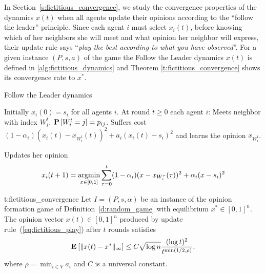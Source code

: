 In Section~\ref{s:fictitious_convergence}, we study the convergence properties
of the dynamics $x(t)$ when all agents update their opinions
according to the \enquote{follow the leader} principle.
Since each agent $i$ must select $x_i(t)$, before knowing which of her neighbors she
will meet and what opinion her neighbor will express, their update rule
says \enquote{\emph{play the best according to what you have observed}}.
For a given instance $(P,s,a)$ of the game %
the Follow the Leader dynamics $x(t)$ is defined in \ref{alg:fictitious_dynamics} and
Theorem \ref{t:fictitious_convergence} shows its convergence rate to $x^*$.
%
\begin{algorithm}
  \caption{Follow the Leader dynamics}
  \label{alg:fictitious_dynamics}
  \begin{algorithmic}[1]
    \STATE Initially $x_i(0) = s_i$ for all agents $i$.
    \STATE At round $t\geq 0$ each agent $i$:
    \bindent
    \STATE Meets neighbor with index $W_i^t$, $\bm{\mathrm{P}}\left[W_i^t=j\right]=p_{ij}$.
    \STATE Suffers cost \((1-\alpha_i) (x_i(t) - x_{W_i^t}(t))^2 + a_i (x_i(t) - s_i)^2\)
    and learns the opinion $x_{W_i^t}$.
  \item Updates her opinion
    \begin{equation}\label{eq:fictitious_play}
      x_i(t+1) =
      \operatorname*{argmin}_{x \in [0,1]}
      \sum_{\tau=0}^{t}(1-\alpha_i)(x-x_{W_i^\tau}(\tau))^2+\alpha_i(x-s_i)^2
    \end{equation}
    \eindent
  \end{algorithmic}
\end{algorithm}
%

%
\begin{reptheorem}{t:fictitious_convergence}
  Let $I = (P,s, \alpha)$ be an instance of the opinion formation
  game of Definition~\ref{d:random_game} with equilibrium
  $x^* \in [0,1]^n$.  The opinion vector $x(t)\in[0,1]^n$ produced by
  update rule~(\ref{eq:fictitious_play}) after $t$ rounds satisfies
  \[
    \bm{\mathrm{E}}_{} \left[ \| x(t) - x^* \|_{\infty} \right] \leq
    C \sqrt{\log n}\frac{(\log t)^{2}}{t^{\min(1/2,\rho)}},
  \]
  where $\rho = \min_{i \in V} a_i$ and $C$ is a universal constant.
\end{reptheorem}


